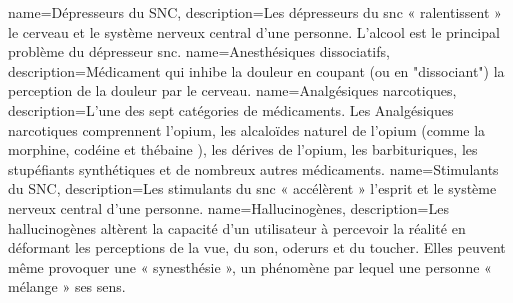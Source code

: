 
{
    name={Dépresseurs du SNC},
    description={Les dépresseurs du \acrshort{snc} « ralentissent » le cerveau et le système nerveux central d’une personne. L'alcool est le principal problème du dépresseur \acrshort{snc}.\cite{dre:hardcore}}
}
{
    name={Anesthésiques dissociatifs},
    description={Médicament qui inhibe la douleur en coupant (ou en "dissociant") la perception de la douleur par le cerveau.\cite{dre:hardcore}}
}
{
    name={Analgésiques narcotiques},
    description={L'une des sept catégories de médicaments. Les Analgésiques narcotiques comprennent l'opium, les alcaloïdes naturel de l'opium (comme la morphine, codéine et thébaine ), les dérives de l'opium, les barbituriques, les stupéfiants synthétiques et de nombreux autres médicaments.\cite{dre:hardcore}}
}
{
    name={Stimulants du SNC},
    description={Les stimulants du \acrshort{snc} « accélèrent » l’esprit et le système nerveux central d’une personne.\cite{dre:hardcore}}
}
{
    name={Hallucinogènes},
    description={Les hallucinogènes altèrent la capacité d’un utilisateur à percevoir la réalité en déformant les perceptions de la vue, du son, oderurs et du toucher. Elles peuvent même provoquer une « synesthésie », un phénomène par lequel une personne « mélange » ses sens.\cite{dre:hardcore}}
}
